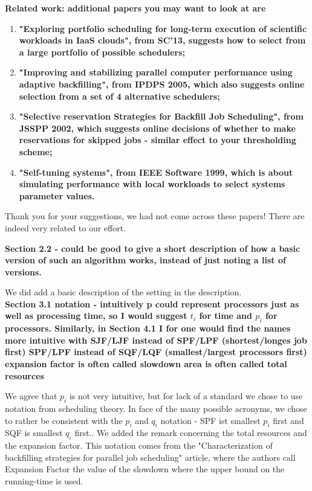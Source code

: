 \documentclass[]{article}
\begin{document}
\textbf{Related work: additional papers you may want to look at are}
\begin{enumerate}

  \item \textbf{"Exploring portfolio scheduling for long-term execution of
    scientific workloads in IaaS clouds", from SC'13, suggests how to select
    from a large portfolio of possible schedulers;}

  \item \textbf{"Improving and stabilizing parallel computer performance using
    adaptive backfilling", from IPDPS 2005, which also suggests online
    selection from a set of 4 alternative schedulers;}

  \item \textbf{"Selective reservation Strategies for Backfill Job Scheduling",
    from JSSPP 2002, which suggests online decisions of whether to make
    reservations for skipped jobs - similar effect to your thresholding
    scheme;}

  \item \textbf{"Self-tuning systems", from IEEE Software 1999, which is about
    simulating performance with local workloads to select systems parameter
    values.}

\end{enumerate}
Thank you for your suggestions, we had not come across these papers! There are indeed very related to our effort.

\textbf{Section 2.2 - could be good to give a short description of how a basic
    version of such an algorithm works, instead of just noting a list of
    versions.}

We did add a basic description of the setting in the description.\\

\textbf{Section 3.1 notation - intuitively p could represent processors just as
well as processing time, so I would suggest $t_i$ for time and $p_i$ for
processors.  Similarly, in Section 4.1 I for one would find the names more
intuitive with SJF/LJF instead of SPF/LPF (shortest/longes job first) SPF/LPF
instead of SQF/LQF (smallest/largest processors first) expansion factor is
often called slowdown area is often called total resources}

We agree that $p_i$ is not very intuitive, but for lack of a standard we chose
to use notation from scheduling theory.  In face of the many possible acronyms,
we chose to rather be consistent with the $p_i$ and $q_i$ notation - SPF ist
smallest $p_i$ first and SQF is smallest $q_i$ first..  We added the remark
concerning the total resources and the expansion factor. This notation comes
from the "Characterization of backfilling strategies for parallel job
scheduling" article, where the authors call Expansion Factor the value of the
slowdown where the upper bound on the running-time is used.\\
\end{document}
